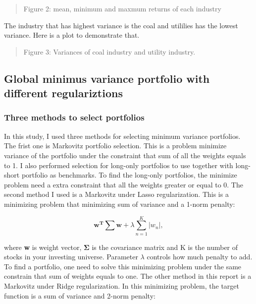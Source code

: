 \documentclass{article}
\newcommand{\ciapdf}[1]{\vspace*{-\parskip}\begin{center}\resizebox{0.75\textwidth}{!}{\texttt{[image: \#1]}}\end{center}}
\begin{document}
\ciapdf{Figure_2T2.pdf}

\begin{quote}
Figure 2: mean, minimum and maxmum returns of each industry
\end{quote}

The industry that has highest variance is the coal and utililies has the lowest
variance. Here is a plot to demonstrate that.

\ciapdf{Figure_3T2.pdf}

\begin{quote}
Figure 3: Variances of coal industry and utility industry.
\end{quote}

\subsection*{Global minimus variance portfolio with different regulariztions}

\subsubsection*{Three methods to select portfolios}

In this study, I used three methods for selecting minimum variance portfolios.
The frist one is Markovitz portfolio selection. This is a problem minimize variance
of the portfolio under the constraint that sum of all the weights equals to 1.
I also performed selection for long-only portfolios to use together with long-short
portfolio as benchmarks. To find the long-only portfolios, the minimize problem
need a extra constraint that all the weights greater or equal to 0. The second
method I used is a Markovitz under Lasso regularization. This is a minimizing
problem that minimizing sum of variance and a 1-norm penalty:

\begin{equation*}
\mathbf{w^T\sum w} + \lambda \sum_{n= 1}^{K}\left | w_n \right |,
\end{equation*}

where \textbf{w} is weight vector, $\mathbf{\Sigma}$ is the covariance matrix
and K is the number of stocks in your investing universe. Parameter $\lambda$
controls how much penalty to add. To find a portfolio, one need to
solve this minimizing problem under the same constrain that sum of weights equals
to one. The other method in this report is a Markovitz under Ridge regularization.
In this minimizing problem, the target function is a sum of variance and 2-norm
penalty:
\end{document}
